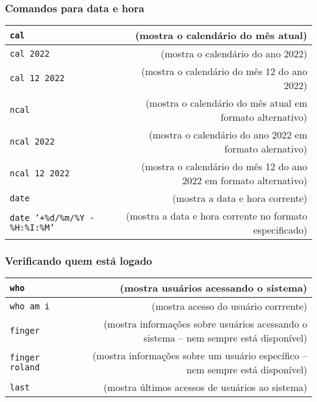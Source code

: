 \documentclass[aspectratio=169]{beamer}
\begin{document}
\begin{frame}\frametitle{Comandos para data e hora}
\begin{tabular}{lp{1cm}r}
\texttt{cal} & & \tiny{(mostra o calendário do mês atual)}\\\hline
\texttt{cal 2022} & & \tiny{(mostra o calendário do ano 2022)}\\\hline
\texttt{cal 12 2022} & & \tiny{(mostra o calendário do mês 12 do ano 2022)}\\\hline
\texttt{ncal} & & \tiny{(mostra o calendário do mês atual em formato alternativo)}\\\hline
\texttt{ncal 2022} & & \tiny{(mostra o calendário do ano 2022 em formato alernativo)}\\\hline
\texttt{ncal 12 2022} & & \tiny{(mostra o calendário do mês 12 do ano 2022 em formato alternativo)}\\\hline
\texttt{date} & & \tiny{(mostra a data e hora corrente)}\\\hline
\texttt{date '+\%d/\%m/\%Y - \%H:\%I:\%M'} & & \tiny{(mostra a data e hora corrente no formato especificado)}\\
\end{tabular}
\end{frame}

\begin{frame}\frametitle{Verificando quem está logado}
\begin{tabular}{lp{2cm}r}	
\texttt{who} & & \tiny{(mostra usuários acessando o sistema)}\\\hline
\texttt{who am i} & & \tiny{(mostra acesso do usuário corrrente)}\\\hline
\texttt{finger} & & \tiny{(mostra informações sobre usuários acessando o sistema -- nem sempre está disponível)}\\\hline
\texttt{finger roland} & & \tiny{(mostra informações sobre um usuário específico -- nem sempre está disponível)}\\\hline
\texttt{last} & & \tiny{(mostra últimos acessos de usuários ao sistema)}\\
\end{tabular}
\end{frame}
\end{document}
